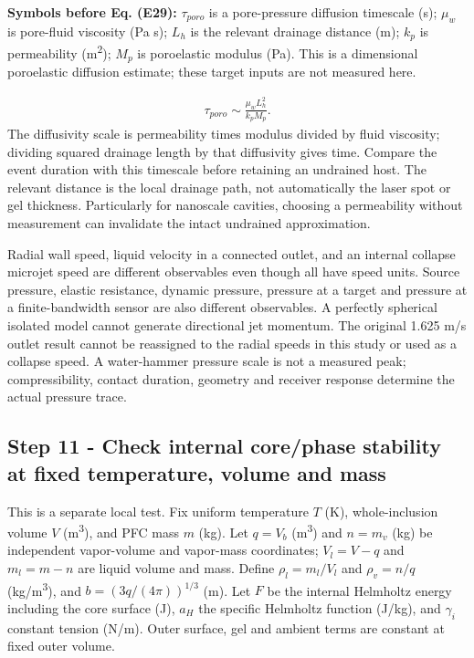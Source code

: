 \documentclass[10pt,a4paper]{article}
\begin{document}
\textbf{Symbols before Eq. (E29):} $\tau_{poro}$ is a pore-pressure diffusion timescale (s); $\mu_w$ is pore-fluid viscosity (Pa s); $L_h$ is the relevant drainage distance (m); $k_p$ is permeability (m\textsuperscript{2}); $M_p$ is poroelastic modulus (Pa). This is a dimensional poroelastic diffusion estimate; these target inputs are not measured here.

{\small\begin{align*}
\tau_{poro}\sim\frac{\mu_w L_h^2}{k_p M_p}. \tag{E29}
\end{align*}}
The diffusivity scale is permeability times modulus divided by fluid viscosity; dividing squared drainage length by that diffusivity gives time. Compare the event duration with this timescale before retaining an undrained host. The relevant distance is the local drainage path, not automatically the laser spot or gel thickness. Particularly for nanoscale cavities, choosing a permeability without measurement can invalidate the intact undrained approximation.

Radial wall speed, liquid velocity in a connected outlet, and an internal collapse microjet speed are different observables even though all have speed units. Source pressure, elastic resistance, dynamic pressure, pressure at a target and pressure at a finite-bandwidth sensor are also different observables. A perfectly spherical isolated model cannot generate directional jet momentum. The original 1.625 m/s outlet result cannot be reassigned to the radial speeds in this study or used as a collapse speed. A water-hammer pressure scale is not a measured peak; compressibility, contact duration, geometry and receiver response determine the actual pressure trace.

\subsection*{Step 11  -  Check internal core/phase stability at fixed temperature, volume and mass}
This is a separate local test. Fix uniform temperature $T$ (K), whole-inclusion volume $V$ (m\textsuperscript{3}), and PFC mass $m$ (kg). Let $q=V_b$ (m\textsuperscript{3}) and $n=m_v$ (kg) be independent vapor-volume and vapor-mass coordinates; $V_l=V-q$ and $m_l=m-n$ are liquid volume and mass. Define $\rho_l=m_l/V_l$ and $\rho_v=n/q$ (kg/m\textsuperscript{3}), and $b=(3q/(4\pi))^{1/3}$ (m). Let $F$ be the internal Helmholtz energy including the core surface (J), $a_H$ the specific Helmholtz function (J/kg), and $\gamma_i$ constant tension (N/m). Outer surface, gel and ambient terms are constant at fixed outer volume.
\end{document}

